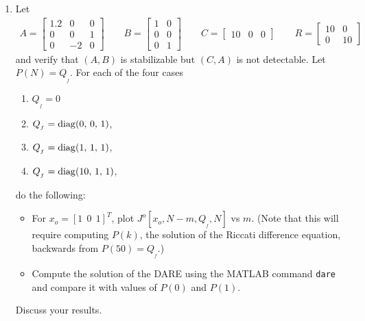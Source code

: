 \begin{enumerate}

\item
\label{case:a}
Let
\begin{align*}
    A = \begin{bmatrix}
            1.2  & 0 & 0 \\
            0 & 0 & 1 \\
            0 & -2 & 0
        \end{bmatrix} \hspace{2em}
        B = \begin{bmatrix}
            1 & 0 \\
            0 & 0 \\
            0 & 1 \end{bmatrix} \hspace{2em}
        C = \begin{bmatrix}
            10 & 0 & 0
        \end{bmatrix} \hspace{2em} R = \begin{bmatrix}
            10 & 0 \\
            0 & 10
        \end{bmatrix}
\end{align*}
and verify that $(A,B)$ is stabilizable but $(C,A)$ is not detectable. Let $P(N) = Q_{_f}$. For each of the four cases
\begin{enumerate}
    \item $Q_{_f} = 0$
    \item $Q_{_f} = {\rm diag}(0,\,0,\,1)$,
    \item $Q_{_f} = {\rm diag}(1,\,1,\,1)$,
    \item $Q_{_f} = {\rm diag}(10,\,1,\,1)$,
\end{enumerate}
do the following:

\begin{itemize}
    \item
    For $x_o = [1 \ \ 0 \ \ 1]^T$, plot $J^o[x_o, N - m, Q_{_f}, N] $  vs $m$. (Note that this will require computing $P(k)$, the solution of the Riccati difference equation, backwards from $P(50) = Q_{_f}$.)

    \item
    Compute the solution of the DARE using the MATLAB command {\tt dare} and compare it with values of $P(0)$ and $P(1)$.

\end{itemize}
Discuss your results.



\end{enumerate}
